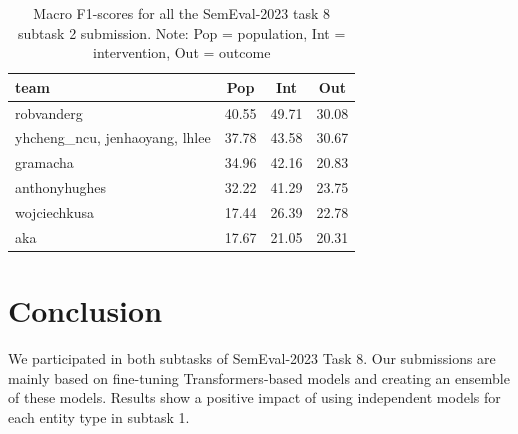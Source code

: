 \documentclass[11pt]{article}
\begin{document}
%
\begin{table}[!ht]
    \centering
    \begin{tabular}{p{3.3cm}c c c }
    \toprule
    team & Pop & Int & Out \\
    \midrule
        robvanderg & 40.55 & 49.71 & 30.08 \\
        yhcheng\_ncu, jenhaoyang, lhlee & 37.78 & 43.58 & 30.67 \\
        gramacha & 34.96 & 42.16 & 20.83 \\ 
        anthonyhughes & 32.22 & 41.29 & 23.75 \\
        wojciechkusa & 17.44 & 26.39 & 22.78 \\ 
        aka & 17.67 & 21.05 & 20.31 \\
    \bottomrule
    \end{tabular}
    \caption{Macro F1-scores for all the SemEval-2023 task 8 subtask 2 submission. Note: Pop = population, Int = intervention, Out = outcome}
\label{tab:leaderboard}
\end{table}
%
%
%
\section{Conclusion}
%

We participated in both subtasks of SemEval-2023 Task 8.
Our submissions are mainly based on fine-tuning Transformers-based models and creating an ensemble of these models.
Results show a positive impact of using independent models for each entity type in subtask 1.

%
%
%



\end{document}

